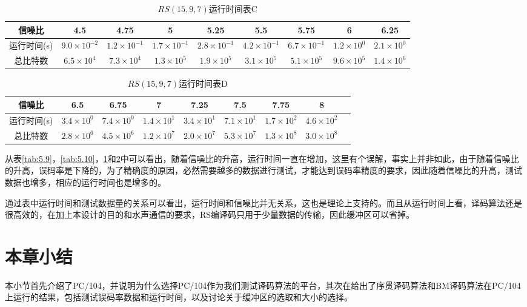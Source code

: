 \begin{table}[htpb]
   \caption{$RS(15,9,7)$运行时间表C}
  \label{tab:5.11}
  \centering
  \wuhao
  \begin{tabular}{|c||c|c|c|c|c|c|c|c|}
    \hline
    信噪比&4.5&4.75&5&5.25&5.5&5.75&6&6.25\\
    \hline
    \hline
    运行时间(s)&$9.0\times 10^{-2}$&$1.2\times
    10^{-1}$&$1.7\times 10^{-1}$&$2.8\times 10^{-1}$&$4.2\times 10^{-1}$&$6.7\times 10^{-1}$&$1.2\times 10^0$&$2.1\times 10^0$\\
    总比特数&$6.5\times 10^4$&$7.3\times 10^4$&$1.3\times
    10^5$&$1.9\times 10^5$&$3.1\times 10^5$&$5.1\times 10^5$&$9.6\times 10^5$&$1.4\times
    10^6$\\
    \hline
  \end{tabular}
 
\end{table}

\begin{table}[htpb]
    \caption{$RS(15,9,7)$运行时间表D}
  \label{tab:5.12}
  \centering
  \wuhao
  \begin{tabular}{|c||c|c|c|c|c|c|c|c|}
    \hline
    信噪比&6.5&6.75&7&7.25&7.5&7.75&8\\
    \hline
    \hline
    运行时间(s)&$3.4\times 10^{0}$&$7.4\times 10^{0}$&$1.4\times
    10^{1}$&$3.4\times 10^{1}$&$7.1\times 10^{1}$&$1.7\times
    10^{2}$&$4.6\times 10^{2}$\\
    总比特数&$2.8\times 10^6$&$4.5\times 10^6$&$1.2\times
    10^7$&$2.0\times 10^7$&$5.3\times 10^7$&$1.3\times 10^8$&$3.0\times
    10^8$\\
    \hline
  \end{tabular}

\end{table}
从表\ref{tab:5.9}，\ref{tab:5.10}，\ref{tab:5.11}和\ref{tab:5.12}中可以看出，随着信噪比的升高，运行时间一直在增加，这里有个误解，事实上并非如此，由于随着信噪比的升高，误码率是下降的，为了精确度的原因，必然需要越多的数据进行测试，才能达到误码率精度的要求，因此随着信噪比的升高，测试数据也增多，相应的运行时间也是增多的。

通过表中运行时间和测试数据量的关系可以看出，运行时间和信噪比并无关系，这也是理论上支持的。而且从运行时间上看，译码算法还是很高效的，在加上本设计的目的和水声通信的要求，RS编译码只用于少量数据的传输，因此缓冲区可以省掉。
\section{本章小结}
本小节首先介绍了PC/104，并说明为什么选择PC/104作为我们测试译码算法的平台，其次在给出了序贯译码算法和BM译码算法在PC/104上运行的结果，包括测试误码率数据和运行时间，以及讨论关于缓冲区的选取和大小的选择。
%
